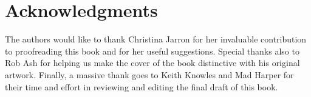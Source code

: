 %
%
%
\chapter*{Acknowledgments}
The authors would like to thank Christina Jarron for her invaluable contribution to proofreading this book and for her useful suggestions. Special thanks also to Rob Ash for helping us make the cover of the book distinctive with his original artwork. Finally, a massive thank goes to Keith Knowles and Mad Harper for their time and effort in reviewing and editing the final draft of this book.

